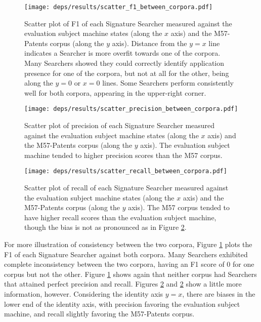 \documentclass[11pt]{ucthesis}
\theoremstyle{plain}
\theoremstyle{definition}
\begin{document}
\begin{figure}
  \centering
  \texttt{[image: deps/results/scatter\_f1\_between\_corpora.pdf]}
  \caption{Scatter plot of F1 of each Signature Searcher measured against the evaluation subject machine states (along the $x$ axis) and the M57-Patents corpus (along the $y$ axis).  Distance from the $y=x$ line indicates a Searcher is more overfit towards one of the corpora.  Many Searchers showed they could correctly identify application presence for one of the corpora, but not at all for the other, being along the $y=0$ or $x=0$ lines.  Some Searchers perform consistently well for both corpora, appearing in the upper-right corner.}
  \label{fig:scatterbetweencorpora:f1}
\end{figure}

\begin{figure}
  \centering
  \texttt{[image: deps/results/scatter\_precision\_between\_corpora.pdf]}
  \caption{Scatter plot of precision of each Signature Searcher measured against the evaluation subject machine states (along the $x$ axis) and the M57-Patents corpus (along the $y$ axis).  The evaluation subject machine tended to higher precision scores than the M57 corpus.}
  \label{fig:scatterbetweencorpora:precision}
\end{figure}

\begin{figure}
  \centering
  \texttt{[image: deps/results/scatter\_recall\_between\_corpora.pdf]}
  \caption{Scatter plot of recall of each Signature Searcher measured against the evaluation subject machine states (along the $x$ axis) and the M57-Patents corpus (along the $y$ axis).  The M57 corpus tended to have higher recall scores than the evaluation subject machine, though the bias is not as pronounced as in Figure \ref{fig:scatterbetweencorpora:precision}.}
  \label{fig:scatterbetweencorpora:recall}
\end{figure}

For more illustration of consistency between the two corpora, Figure \ref{fig:scatterbetweencorpora:f1} plots the F1 of each Signature Searcher against both corpora.  Many Searchers exhibited complete inconsistency between the two corpora, having an F1 score of 0 for one corpus but not the other.  Figure \ref{fig:scatterbetweencorpora:f1} shows again that neither corpus had Searchers that attained perfect precision and recall.  Figures \ref{fig:scatterbetweencorpora:precision} and \ref{fig:scatterbetweencorpora:precision} show a little more information, however.  Considering the identity axis $y=x$, there are biases in the lower end of the identity axis, with precision favoring the evaluation subject machine, and recall slightly favoring the M57-Patents corpus.
\end{document}
